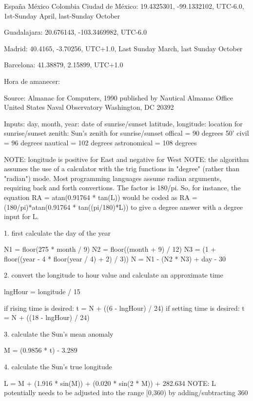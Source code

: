 España
México
Colombia
Ciudad de México: 19.4325301, -99.1332102, UTC-6.0, 1st-Sunday April, last-Sunday October

Guadalajara: 20.676143, -103.3469982, UTC-6.0

Madrid: 40.4165, -3.70256, UTC+1.0, Last Sunday March, last Sunday October

Barcelona: 41.38879, 2.15899, UTC+1.0



Hora de amanecer:

Source:
	Almanac for Computers, 1990
	published by Nautical Almanac Office
	United States Naval Observatory
	Washington, DC 20392

Inputs:
	day, month, year:      date of sunrise/sunset
	latitude, longitude:   location for sunrise/sunset
	zenith:                Sun's zenith for sunrise/sunset
	  offical      = 90 degrees 50'
	  civil        = 96 degrees
	  nautical     = 102 degrees
	  astronomical = 108 degrees
	
	NOTE: longitude is positive for East and negative for West
        NOTE: the algorithm assumes the use of a calculator with the
        trig functions in "degree" (rather than "radian") mode. Most
        programming languages assume radian arguments, requiring back
        and forth convertions. The factor is 180/pi. So, for instance,
        the equation RA = atan(0.91764 * tan(L)) would be coded as RA
        = (180/pi)*atan(0.91764 * tan((pi/180)*L)) to give a degree
        answer with a degree input for L.


1. first calculate the day of the year

	N1 = floor(275 * month / 9)
	N2 = floor((month + 9) / 12)
	N3 = (1 + floor((year - 4 * floor(year / 4) + 2) / 3))
	N = N1 - (N2 * N3) + day - 30

2. convert the longitude to hour value and calculate an approximate time

	lngHour = longitude / 15
	
	if rising time is desired:
	  t = N + ((6 - lngHour) / 24)
	if setting time is desired:
	  t = N + ((18 - lngHour) / 24)

3. calculate the Sun's mean anomaly
	
	M = (0.9856 * t) - 3.289

4. calculate the Sun's true longitude
	
	L = M + (1.916 * sin(M)) + (0.020 * sin(2 * M)) + 282.634
	NOTE: L potentially needs to be adjusted into the range [0,360) by adding/subtracting 360

